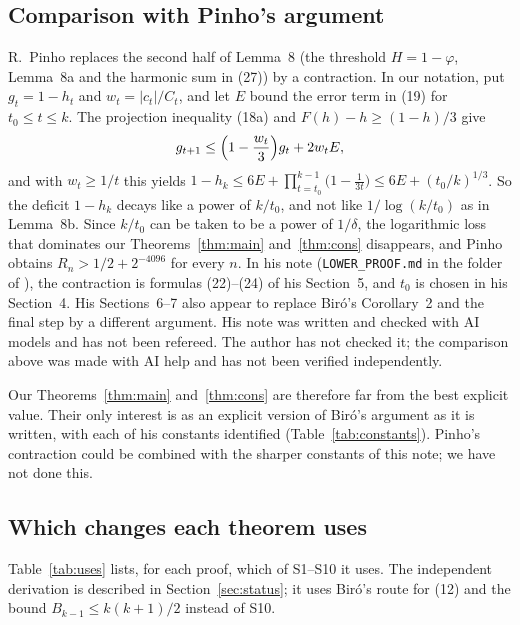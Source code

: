 \documentclass[11pt]{amsart}
\theoremstyle{remark}
\theoremstyle{plain}
\newcommand{\abs}[1]{\lvert #1\rvert}
\begin{document}
\subsection{Comparison with Pinho's argument}\label{sec:pinho}
R.~Pinho \cite{Pin310} replaces the second half of Lemma~8 (the threshold $H=1-\varphi$, Lemma~8a and the harmonic sum in (27)) by a contraction. In our notation, put $g_t=1-h_t$ and $w_t=\abs{c_t}/C_t$, and let $E$ bound the error term in (19) for $t_0\le t\le k$. The projection inequality (18a) and $F(h)-h\ge(1-h)/3$ give
\[
g_{t+1}\le\Bigl(1-\frac{w_t}{3}\Bigr)g_t+2w_tE ,
\]
and with $w_t\ge1/t$ this yields $1-h_k\le6E+\prod_{t=t_0}^{k-1}\bigl(1-\tfrac1{3t}\bigr)\le6E+(t_0/k)^{1/3}$. So the deficit $1-h_k$ decays like a power of $k/t_0$, and not like $1/\log(k/t_0)$ as in Lemma~8b. Since $k/t_0$ can be taken to be a power of $1/\delta$, the logarithmic loss that dominates our Theorems~\ref{thm:main} and~\ref{thm:cons} disappears, and Pinho obtains $R_n>1/2+2^{-4096}$ for every $n$.    In his note (\texttt{LOWER\_PROOF.md} in the folder of \cite{Pin310}), the contraction is formulas (22)--(24) of his Section~5, and $t_0$ is chosen in his Section~4. His Sections~6--7 also appear to replace Bir\'o's Corollary~2 and the final step by a different argument. His note was written and checked with AI models and has not been refereed. The author has not checked it; the comparison above was made with AI help and has not been verified independently.

Our Theorems~\ref{thm:main} and~\ref{thm:cons} are therefore far from the best explicit value. Their only interest is as an explicit version of Bir\'o's argument as it is written, with each of his constants identified (Table~\ref{tab:constants}). Pinho's contraction could be combined with the sharper constants of this note; we have not done this.

\subsection{Which changes each theorem uses}
Table~\ref{tab:uses} lists, for each proof, which of S1--S10 it uses. The independent derivation is described in Section~\ref{sec:status}; it uses Bir\'o's route for (12) and the bound $B_{k-1}\le k(k+1)/2$ instead of S10.
\end{document}
